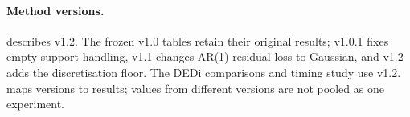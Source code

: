 \paragraph{Method versions.}  describes v1.2. The frozen v1.0 tables retain their original results; v1.0.1 fixes empty-support handling, v1.1 changes AR(1) residual loss to Gaussian, and v1.2 adds the discretisation floor. The DEDi comparisons and timing study use v1.2.  maps versions to results; values from different versions are not pooled as one experiment.
